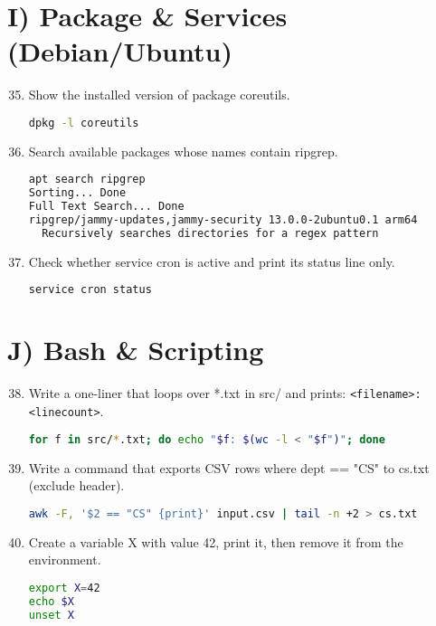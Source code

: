 \section*{I) Package \& Services (Debian/Ubuntu)}
\begin{enumerate}
\setcounter{enumi}{34}
\item Show the installed version of package coreutils. \vspace{2em}\\
\begin{lstlisting}[language=sh]
dpkg -l coreutils
\end{lstlisting}
\item Search available packages whose names contain ripgrep. \vspace{2em}\\
\begin{lstlisting}[language=sh]
apt search ripgrep
Sorting... Done
Full Text Search... Done
ripgrep/jammy-updates,jammy-security 13.0.0-2ubuntu0.1 arm64
  Recursively searches directories for a regex pattern
\end{lstlisting}
\item Check whether service cron is active and print its status line only. 
\vspace{2em}\\
\begin{lstlisting}[language=sh]
service cron status
\end{lstlisting}
\end{enumerate}

\section*{J) Bash \& Scripting}
\begin{enumerate}
\setcounter{enumi}{37}
\item Write a one-liner that loops over *.txt in src/ and prints: \texttt{<filename>: <linecount>}. \vspace{2em}\\
\begin{lstlisting}[language=sh]
for f in src/*.txt; do echo "$f: $(wc -l < "$f")"; done
\end{lstlisting}
\item Write a command that exports CSV rows where dept == "CS" to cs.txt (exclude header). \vspace{2em}\\
\begin{lstlisting}[language=sh]
awk -F, '$2 == "CS" {print}' input.csv | tail -n +2 > cs.txt
\end{lstlisting}
\item Create a variable X with value 42, print it, then remove it from the environment. \vspace{2em}\\
\begin{lstlisting}[language=sh]
export X=42
echo $X
unset X
\end{lstlisting}
\end{enumerate}
